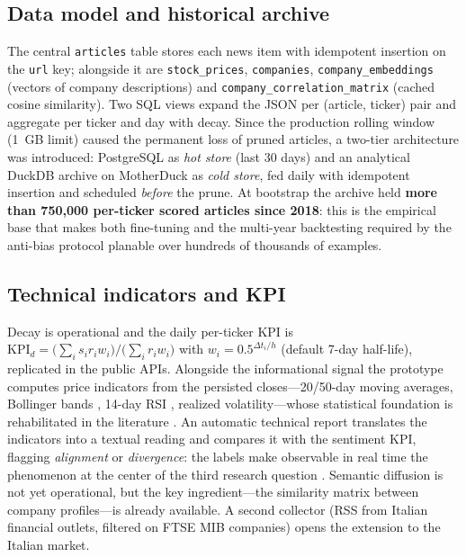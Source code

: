 \documentclass[a4paper,11pt]{article}
\begin{document}
\subsection{Data model and historical archive}

The central \texttt{articles} table stores each news item with idempotent insertion on the \texttt{url} key; alongside it are \texttt{stock\_prices}, \texttt{companies}, \texttt{company\_embeddings} (vectors of company descriptions) and \texttt{company\_correlation\_matrix} (cached cosine similarity). Two SQL views expand the JSON per (article, ticker) pair and aggregate per ticker and day with decay. Since the production rolling window (1~GB limit) caused the permanent loss of pruned articles, a two-tier architecture was introduced: PostgreSQL as \emph{hot store} (last 30 days) and an analytical DuckDB archive on MotherDuck as \emph{cold store}, fed daily with idempotent insertion and scheduled \emph{before} the prune. At bootstrap the archive held \textbf{more than 750{,}000 per-ticker scored articles since 2018}: this is the empirical base that makes both fine-tuning and the multi-year backtesting required by the anti-bias protocol planable over hundreds of thousands of examples.

\subsection{Technical indicators and KPI}

Decay is operational and the daily per-ticker KPI is $\text{KPI}_d=\big(\sum_i s_i r_i w_i\big)/\big(\sum_i r_i w_i\big)$ with $w_i=0.5^{\Delta t_i/h}$ (default 7-day half-life), replicated in the public APIs. Alongside the informational signal the prototype computes price indicators from the persisted closes---20/50-day moving averages, Bollinger bands \parencite{bollinger2001bollinger}, 14-day RSI \parencite{wilder1978new}, realized volatility---whose statistical foundation is rehabilitated in the literature \parencite{lo2000foundations, neely2014forecasting}. An automatic technical report translates the indicators into a textual reading and compares it with the sentiment KPI, flagging \emph{alignment} or \emph{divergence}: the labels make observable in real time the phenomenon at the center of the third research question \parencite{brock1992simple}. Semantic diffusion is not yet operational, but the key ingredient---the similarity matrix between company profiles---is already available. A second collector (RSS from Italian financial outlets, filtered on FTSE MIB companies) opens the extension to the Italian market.
\end{document}
